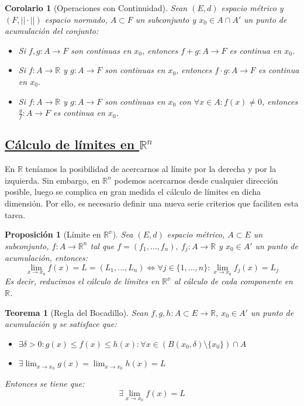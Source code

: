 \documentclass[10pt,a4paper,openright]{book}
\theoremstyle{break}
\newtheorem*{theo}{Teorema}
\newtheorem*{coro}{Corolario}
\newtheorem*{prop}{Proposición}
\begin{document}
\begin{coro}[Operaciones con Continuidad]
Sean $(E,d)$ espacio métrico y $(F, || \cdot ||)$ espacio normado, $A \subset F$ un subconjunto y $x_0 \in A \cap A'$ un punto de acumulación del conjunto:
\begin{itemize}
\item Si $f, g : A \to F$ son continuas en $x_0$, entonces $f + g: A \to F$ es continua en $x_0$.
\item Si $f: A \to \mathbb{R}$ y $g : A \to F$ son continuas en $x_0$, entonces $f \cdot g: A \to F$ es continua en $x_0$.
\item  Si $f: A \to \mathbb{R}$ y $g : A \to F$ son continuas en $x_0$ con $\forall x \in A: f(x) \neq 0$, entonces $\displaystyle \frac{g}{f}: A \to F$ es continua en $x_0$.
\end{itemize}
\end{coro}

\subsection*{\underline{Cálculo de límites en $\mathbb{R}^n$}}
En $\mathbb{R}$ teníamos la posibilidad de acercarnos al límite por la derecha y por la izquierda. Sin embargo, en $\mathbb{R}^n$ podemos acercarnos desde cualquier dirección posible, luego se complica en gran medida el cálculo de límites en dicha dimensión. Por ello, es necesario definir una nueva serie criterios que faciliten esta tarea.

\begin{prop}[Límite en $\mathbb{R^{n}}$]
Sea $(E,d)$ espacio métrico, $A \subset E$ un subconjunto, $f : A \to \mathbb{R}^n$ tal que $f = (f_1, \ldots , f_n),\ f_j : A \to \mathbb{R}$ y $x_0 \in A'$ un punto de acumulación, entonces:
$$\lim_{x \to x_0} f(x) = L = (L_1, \ldots, L_n)\Leftrightarrow \forall j \in \{ 1, \ldots, n\} : \lim_{x \to x_0} f_j (x)= L_j$$
Es decir, reducimos el cálculo de límites en $\mathbb{R^n}$ al cálculo de cada componente en $\mathbb{R}$.
\end{prop}

\begin{theo}[Regla del Bocadillo]
Sean $f,g,h : A \subset E \longrightarrow \mathbb{R}$, $x_0 \in A'$ un punto de acumulación y se satisface que:
\begin{itemize}
\item $\exists \delta > 0 : g(x) \leq f(x) \leq h(x) : \forall x \in \left( B(x_0, \delta) \setminus \{x_0\} \right) \cap A$
\item $\exists \lim_{x \to x_0} g(x) = \lim_{x \to x_0} h(x) = L$
\end{itemize}
Entonces se tiene que:
$$\exists \lim_{x \to x_0} f(x) = L$$
\end{theo}
\end{document}
